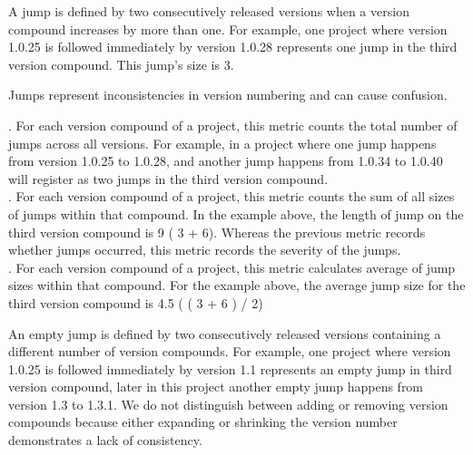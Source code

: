 \documentclass[conference]{IEEEtran}
\begin{document}
 A jump is defined by two consecutively released versions when a version compound increases by more than one.
For example, one project where version 1.0.25 is followed immediately by version 1.0.28 represents one jump in the third version compound. This jump's size is 3.

Jumps represent inconsistencies in version numbering and can cause confusion.
 
.  For each version compound of a project, this metric counts the total number of jumps across all versions. For example, in a project where one jump happens from version 1.0.25 to 1.0.28, and another jump happens from 1.0.34 to 1.0.40 will register as two jumps in the third version compound.\\

.  For each version compound of a project, this metric counts the sum of all sizes of jumps within that compound. 
In the example above, the length of jump on the third version compound is 
9 ( 3 + 6). Whereas the previous metric records whether jumps occurred, this metric records the severity of the jumps. \\
 
. For each version compound of a project, this metric calculates average of  jump sizes within that compound. For the example above, the average jump size for the third version compound is 4.5 ( ( 3 + 6 ) / 2)
 



 An empty jump is defined by two consecutively released versions containing a different number of version compounds. 
For example, one project where version 1.0.25 is followed immediately by version 1.1 represents an empty jump in third version compound, later in this project another empty jump happens from version 1.3 to 1.3.1. We do not distinguish between adding or removing version compounds because either expanding or shrinking the version number demonstrates a lack of consistency.  \\
\end{document}
